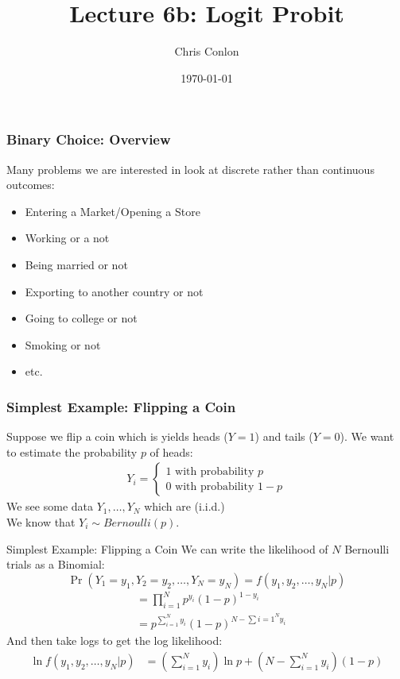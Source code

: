 \documentclass[aspectratio=169,11pt]{beamer}
\title{Lecture 6b: Logit Probit}
\author{Chris Conlon }
\institute{NYU Stern }
\date{\today}
\begin{document}
\maketitle

\begin{frame}
\frametitle{Binary Choice: Overview}
Many problems we are interested in look at discrete rather than continuous outcomes:
\begin{itemize}
\item Entering a Market/Opening a Store
\item Working or a not
\item Being married or not
\item Exporting to another country or not
\item Going to college or not
\item Smoking or not
\item etc.
\end{itemize}
\end{frame}

\begin{frame}
\frametitle{Simplest Example: Flipping a Coin}
Suppose we flip a coin which is yields heads ($Y=1$) and tails ($Y=0$). We want to estimate the probability $p$ of heads:
\begin{align*}
Y_i =
\begin{cases}
1 \mbox{ with probability } p \\
0 \mbox{ with probability } 1-p
\end{cases}
\end{align*}
We see some data $Y_1,\ldots,Y_N$ which are (i.i.d.)\\
\vspace{0.2cm}
We know that $Y_i \sim Bernoulli(p)$.
\end{frame}


\begin{frame}{Simplest Example: Flipping a Coin}
We can write the likelihood of $N$ Bernoulli trials as a Binomial: 
$$\Pr(Y_1 = y_1, Y_2=y_2,\ldots,Y _N=y_N )  =  f(y_1,y_2,\ldots,y_N | p ) $$
\begin{align*}
&= \prod_{i=1}^N p^{y_i} (1-p)^{1-y_i}\\
&= p^{\sum_{i=1}^N y_i} (1-p)^{N-\sum{i=1}^N y_i}
\end{align*}
And then take logs to get the \alert{log likelihood}:
\begin{align*}
\ln  f(y_1,y_2,\ldots,y_N | p )  &= \left( \sum_{i=1}^N y_i \right)  \ln p  + \left(N-\sum_{i=1}^N y_i \right)  (1-p)
\end{align*}
\end{frame}
\end{document}
